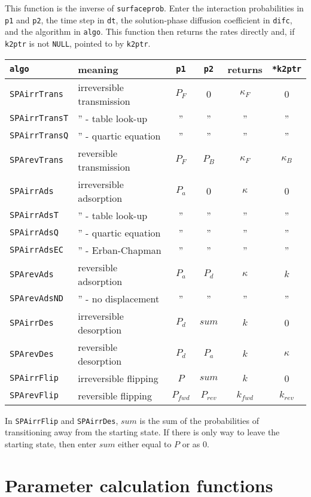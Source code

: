 \documentclass[11pt]{article}
\newcommand {\ttt} {\texttt}
\begin{document}
\begin{description}
This function is the inverse of \ttt{surfaceprob}. Enter the interaction probabilities in \ttt{p1} and \ttt{p2}, the time step in \ttt{dt}, the solution-phase diffusion coefficient in \ttt{difc}, and the algorithm in \ttt{algo}. This function then returns the rates directly and, if \ttt{k2ptr} is not \ttt{NULL}, pointed to by \ttt{k2ptr}.

\begin{longtable}[c]{llcccc}
\ttt{algo} & meaning & \ttt{p1} & \ttt{p2} & returns & \ttt{*k2ptr} \\
\hline
\ttt{SPAirrTrans} & irreversible transmission & $P_F$ & 0 & $\kappa_F$ & 0\\
\ttt{SPAirrTransT} & '' - table look-up & '' & '' & '' & '' \\
\ttt{SPAirrTransQ} & '' - quartic equation & '' & '' & '' & '' \\
\ttt{SPArevTrans} & reversible transmission & $P_F$ & $P_B$ & $\kappa_F$ & $\kappa_B$ \\
\ttt{SPAirrAds} & irreversible adsorption & $P_a$ & 0 & $\kappa$ & 0\\
\ttt{SPAirrAdsT} & '' - table look-up & '' & '' & '' & ''\\
\ttt{SPAirrAdsQ} & '' - quartic equation & '' & '' & '' & ''\\
\ttt{SPAirrAdsEC} & '' - Erban-Chapman & '' & '' & '' & ''\\
\ttt{SPArevAds} & reversible adsorption & $P_a$ & $P_d$ & $\kappa$ & $k$\\
\ttt{SPArevAdsND} & '' - no displacement & '' & '' & '' & ''\\
\ttt{SPAirrDes} & irreversible desorption & $P_d$ & $sum$ & $k$ & 0\\
\ttt{SPArevDes} & reversible desorption & $P_d$ & $P_a$ & $k$ & $\kappa$ \\
\ttt{SPAirrFlip} & irreversible flipping & $P$ & $sum$ & $k$ & 0\\
\ttt{SPArevFlip} & reversible flipping & $P_{fwd}$ & $P_{rev}$ & $k_{fwd}$ & $k_{rev}$
\end{longtable}

In \ttt{SPAirrFlip} and \ttt{SPAirrDes}, $sum$ is the sum of the probabilities of transitioning away from the starting state. If there is only way to leave the starting state, then enter $sum$ either equal to $P$ or as 0.

\end{description}

\section{Parameter calculation functions}
\end{document}
